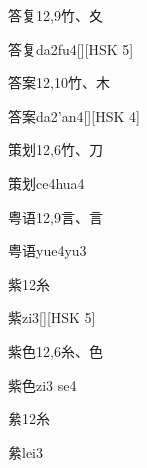 \begin{entry}{答复}{12,9}{⽵、⼢}
  \begin{phonetics}{答复}{da2fu4}[][HSK 5]
  \end{phonetics}
\end{entry}

\begin{entry}{答案}{12,10}{⽵、⽊}
  \begin{phonetics}{答案}{da2'an4}[][HSK 4]
  \end{phonetics}
\end{entry}

\begin{entry}{策划}{12,6}{⽵、⼑}
  \begin{phonetics}{策划}{ce4hua4}
  \end{phonetics}
\end{entry}

\begin{entry}{粤语}{12,9}{⾔、⾔}
  \begin{phonetics}{粤语}{yue4yu3}
  \end{phonetics}
\end{entry}

\begin{entry}{紫}{12}{⽷}
  \begin{phonetics}{紫}{zi3}[][HSK 5]
  \end{phonetics}
\end{entry}

\begin{entry}{紫色}{12,6}{⽷、⾊}
  \begin{phonetics}{紫色}{zi3 se4}
  \end{phonetics}
\end{entry}

\begin{entry}{絫}{12}{⽷}
  \begin{phonetics}{絫}{lei3}
  \end{phonetics}
\end{entry}

